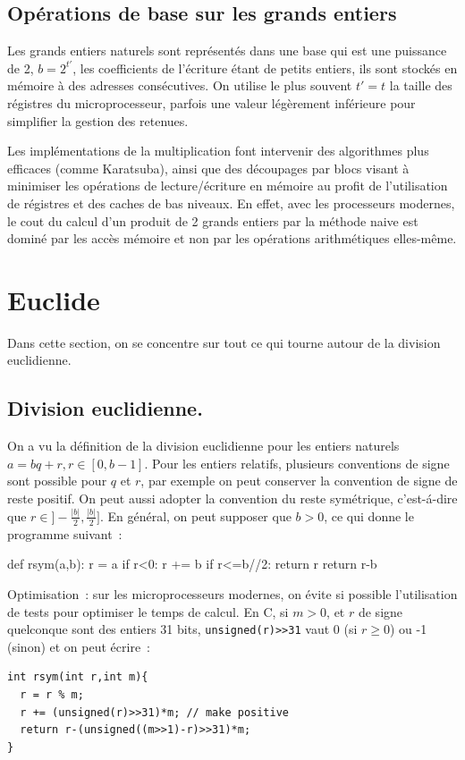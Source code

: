 \documentclass[a4paper,11pt]{book}
\begin{document}
\begin{giacjshere}
\subsection{Op\'erations de base sur les grands entiers}
Les grands entiers naturels sont repr\'esent\'es dans une base qui est une
puissance de 2, $b=2^{t'}$, les coefficients de l'\'ecriture \'etant
de petits entiers, ils sont stock\'es en m\'emoire \`a des
adresses cons\'ecutives. On utilise le plus souvent $t'=t$ la taille des r\'egistres du
microprocesseur, parfois une valeur l\'eg\`erement
inf\'erieure pour simplifier la gestion des retenues.

Les impl\'ementations de la multiplication font intervenir des
algorithmes plus efficaces (comme Karatsuba), ainsi que
des d\'ecoupages par blocs visant \`a minimiser les op\'erations
de lecture/\'ecriture en m\'emoire au profit de l'utilisation de
r\'egistres et des caches de bas niveaux. 
En effet, avec les processeurs modernes, le cout 
du calcul d'un produit de 2 grands entiers par la m\'ethode naive
est domin\'e par les acc\`es m\'emoire et non par les op\'erations
arithm\'etiques elles-m\^eme.



\section{Euclide}
Dans cette section, on se concentre sur tout ce qui tourne
autour de la division euclidienne.

\subsection{Division euclidienne.}
On a vu la d\'efinition de la division euclidienne pour les entiers
naturels $a=bq+r, r\in[0,b-1]$. Pour les entiers relatifs, plusieurs
conventions de signe sont possible pour $q$ et $r$, par
exemple on peut conserver la convention de signe de reste positif.
On peut aussi adopter la convention du reste sym\'etrique,
c'est-\'a-dire que $r \in ]-\frac{|b|}{2},\frac{|b|}{2}]$.
En g\'en\'eral, on peut supposer que $b>0$, ce qui donne le programme suivant~:
\begin{giaconload}
def rsym(a,b):
    r = a %
    if r<0:
        r += b
    if r<=b//2: 
        return r
    return r-b
\end{giaconload}
Optimisation~: sur les microprocesseurs modernes, on \'evite si possible
l'utilisation de tests pour optimiser le temps de calcul. En C, si
$m>0$, et $r$ de signe quelconque sont des entiers 31 bits,
\verb|unsigned(r)>>31| vaut 0 (si $r\geq 0$) ou -1 (sinon) et on peut \'ecrire~:
\begin{verbatim}
int rsym(int r,int m){
  r = r % m;
  r += (unsigned(r)>>31)*m; // make positive
  return r-(unsigned((m>>1)-r)>>31)*m;
}
\end{verbatim}


\end{giacjshere}
\end{document}
